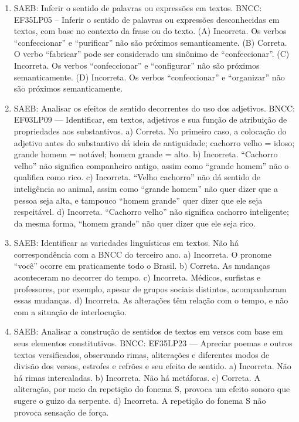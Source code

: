 \begin{enumerate}
\item
SAEB: Inferir o sentido de palavras ou expressões em textos.
BNCC: EF35LP05 -- Inferir o sentido de palavras ou expressões desconhecidas em textos, com base no
contexto da frase ou do texto.
(A) Incorreta. Os verbos ``confeccionar'' e ``purificar'' não são próximos semanticamente.
(B) Correta. O verbo ``fabricar'' pode ser considerado um sinônimo de ``confeccionar''.
(C) Incorreta. Os verbos ``confeccionar'' e ``configurar'' não são próximos semanticamente.
(D) Incorreta. Os verbos ``confeccionar'' e ``organizar'' não são próximos semanticamente.

\item
SAEB: Analisar os efeitos de sentido decorrentes do uso dos adjetivos. BNCC: EF03LP09 --- Identificar, em textos, adjetivos e sua função de atribuição de propriedades aos substantivos. a) Correta. No primeiro caso, a colocação do adjetivo antes do substantivo dá ideia de antiguidade; cachorro velho = idoso; grande homem = notável; homem grande = alto. b) Incorreta. ``Cachorro velho'' não significa companheiro antigo, assim como ``grande homem'' não o qualifica como rico. c) Incorreta. ``Velho cachorro'' não dá sentido de inteligência ao animal, assim como ``grande homem'' não quer dizer que a pessoa seja alta, e tampouco ``homem grande'' quer dizer que ele seja respeitável. d) Incorreta. ``Cachorro velho'' não significa cachorro inteligente; da mesma forma, ``homem grande'' não quer dizer que ele seja rico.

\item
SAEB: Identificar as variedades linguísticas em textos. Não há correspondência com a BNCC do terceiro ano. a) Incorreta. O pronome ``você'' ocorre em praticamente todo o Brasil. b) Correta. As mudanças aconteceram no decorrer do tempo. c) Incorreta. Médicos, surfistas e professores, por exemplo, apesar de grupos sociais distintos, acompanharam essas mudanças. d) Incorreta. As alterações têm relação com o tempo, e não com a situação de interlocução.

\item
SAEB: Analisar a construção de sentidos de textos em versos com base em seus elementos constitutivos. BNCC: EF35LP23 --- Apreciar poemas e outros textos versificados, observando rimas, aliterações e diferentes modos de divisão dos versos, estrofes e refrões e seu efeito de sentido. a) Incorreta. Não há rimas intercaladas. b) Incorreta. Não há metáforas. c) Correta. A aliteração, por meio da repetição do fonema S, provoca um efeito sonoro que sugere o guizo da serpente. d) Incorreta. A repetição do fonema S não provoca sensação de força.


\end{enumerate}
